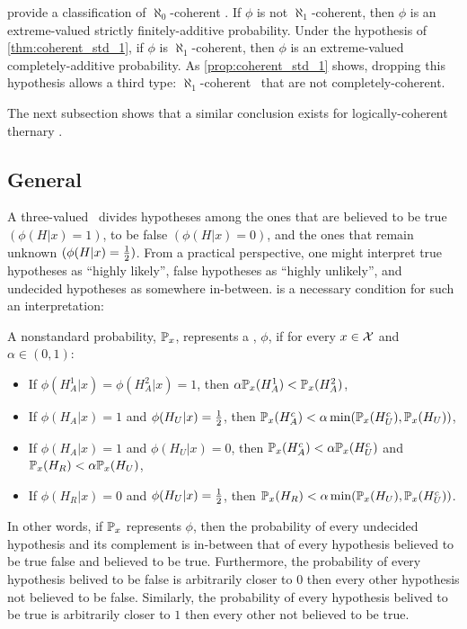  provide a classification of $\aleph_0$-coherent \stdsumms. If $\phi$ is not $\aleph_1$-coherent, then $\phi$ is an extreme-valued strictly finitely-additive probability. Under the hypothesis of \cref{thm:coherent_std_1}, if $\phi$ is $\aleph_1$-coherent, then $\phi$ is an extreme-valued completely-additive probability. As \cref{prop:coherent_std_1} shows, dropping this hypothesis allows a third type: $\aleph_1$-coherent \stdsumms \ that are not completely-coherent.

The next subsection shows that
a similar conclusion exists
for logically-coherent
thernary \summs.

\subsection{General \summs}
\label{sec:coherent_agnostic}

A three-valued \summ\ divides 
hypotheses among
the ones that are believed to be true
$(\phi(H|x) = 1)$, 
to be false
$(\phi(H|x) = 0)$,
and the ones that remain unknown
$(\phi(H|x) = \half)$.
From a practical perspective, 
one might interpret 
true hypotheses as ``highly likely'',
false hypotheses as ``highly unlikely'', and
undecided hypotheses as somewhere in-between.
 is a necessary condition for
such an interpretation:

\begin{definition}
 \label{def:rep}
 A nonstandard probability, $\P_x$, 
 represents a \summ, $\phi$, if
 for every $x \in \sX$ and $\alpha \in (0,1)$:
 \begin{itemize}
  \item If $\phi(H_A^1|x) = \phi(H_A^2|x) = 1$,
  then $\alpha\P_x(H_A^1) < \P_x(H_A^2)$,
  \item If $\phi(H_A|x) = 1$ and 
  $\phi(H_U|x) = \half$, then
  $\P_x(H_A^c) < 
  \alpha \min(\P_x(H_U^c), \P_x(H_U))$,
  \item If $\phi(H_A|x) = 1$ and 
  $\phi(H_U|x) = 0$, then
  $\P_x(H_A^c) < 
  \alpha \P_x(H_U^c)$ and
  $\P_x(H_R) < \alpha \P_x(H_U)$,
  \item  If $\phi(H_R|x) = 0$ and
  $\phi(H_U|x) = \half$, then
  $\P_x(H_R) 
  < \alpha \min(\P_x(H_U),\P_x(H_U^c))$.
 \end{itemize}
\end{definition}

In other words, if $\P_x$ represents $\phi$,
then the probability of 
every undecided hypothesis and its complement is
in-between that of every hypothesis
believed to be true false and 
believed to be true.
Furthermore, the probability of every
hypothesis belived to be false is 
arbitrarily closer to $0$
then every other hypothesis 
not believed to be false.
Similarly,
the probability of every hypothesis
belived to be true
is arbitrarily closer to $1$ then 
every other not believed to be true.

